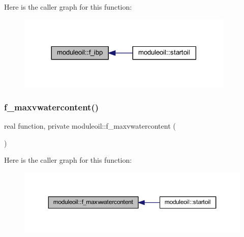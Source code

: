 Here is the caller graph for this function\+:\nopagebreak
\begin{figure}[H]
\begin{center}
\leavevmode
\includegraphics[width=293pt]{namespacemoduleoil_ad53f4584cf329af849a4ee69c63351c9_icgraph}
\end{center}
\end{figure}
\mbox{\label{namespacemoduleoil_ac29f4466dc5d483c853827737c3aa61e}} 
\subsubsection{\texorpdfstring{f\+\_\+maxvwatercontent()}{f\_maxvwatercontent()}}
{\footnotesize\ttfamily real function, private moduleoil\+::f\+\_\+maxvwatercontent (\begin{DoxyParamCaption}{ }\end{DoxyParamCaption})\hspace{0.3cm}{\ttfamily [private]}}

Here is the caller graph for this function\+:\nopagebreak
\begin{figure}[H]
\begin{center}
\leavevmode
\includegraphics[width=350pt]{namespacemoduleoil_ac29f4466dc5d483c853827737c3aa61e_icgraph}
\end{center}
\end{figure}
\mbox{\label{namespacemoduleoil_adabc2068ec1e8096747e483ba890f006}} 
